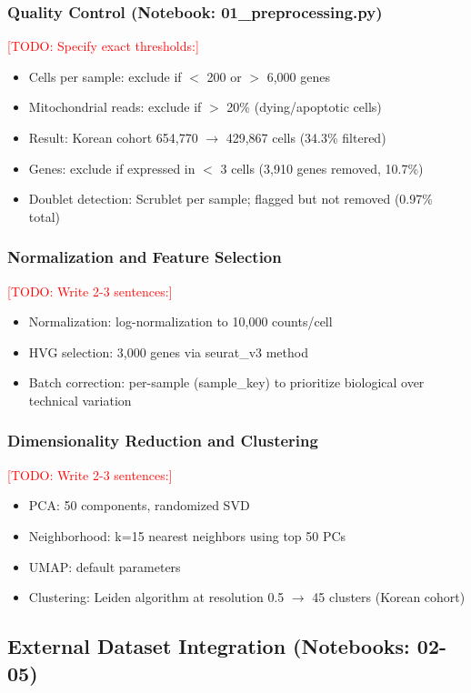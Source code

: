 \documentclass[12pt,oneside]{article}
\newcommand{\TODO}[1]{\textcolor{red}{[TODO: #1]}}
\begin{document}
\subsubsection{Quality Control (Notebook: 01\_preprocessing.py)}
\TODO{Specify exact thresholds:}
\begin{itemize}
    \item Cells per sample: exclude if $<$ 200 or $>$ 6,000 genes
    \item Mitochondrial reads: exclude if $>$ 20\% (dying/apoptotic cells)
    \item Result: Korean cohort 654,770 $\to$ 429,867 cells (34.3\% filtered)
    \item Genes: exclude if expressed in $<$ 3 cells (3,910 genes removed, 10.7\%)
    \item Doublet detection: Scrublet per sample; flagged but not removed (0.97\% total)
\end{itemize}

\subsubsection{Normalization and Feature Selection}
\TODO{Write 2-3 sentences:}
\begin{itemize}
    \item Normalization: log-normalization to 10,000 counts/cell
    \item HVG selection: 3,000 genes via seurat\_v3 method
    \item Batch correction: per-sample (sample\_key) to prioritize biological over technical variation
\end{itemize}

\subsubsection{Dimensionality Reduction and Clustering}
\TODO{Write 2-3 sentences:}
\begin{itemize}
    \item PCA: 50 components, randomized SVD
    \item Neighborhood: k=15 nearest neighbors using top 50 PCs
    \item UMAP: default parameters
    \item Clustering: Leiden algorithm at resolution 0.5 $\to$ 45 clusters (Korean cohort)
\end{itemize}

\subsection{External Dataset Integration (Notebooks: 02-05)}
\end{document}
